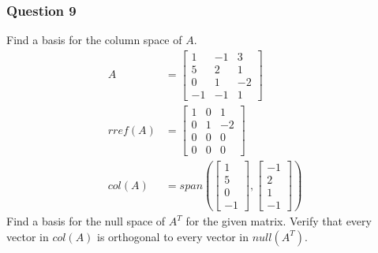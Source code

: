 \documentclass{math}
\begin{document}
\subsubsection*{Question 9}
Find a basis for the column space of \( A \).
\begin{align*}
  A &= \begin{bmatrix}
    1 & -1 & 3 \\
    5 & 2 & 1 \\
    0 & 1 & -2 \\
    -1 & -1 & 1
  \end{bmatrix} \\
  rref(A) &= \begin{bmatrix}
    1 & 0 & 1 \\
    0 & 1 & -2 \\
    0 & 0 & 0 \\
    0 & 0 & 0
  \end{bmatrix} \\
  col(A) &= span\left(
    \begin{bmatrix}1 \\ 5 \\ 0 \\ -1\end{bmatrix},
    \begin{bmatrix}-1 \\ 2 \\ 1 \\ -1\end{bmatrix}
  \right)
\end{align*}
Find a basis for the null space of \( A^T \) for the given matrix. Verify that
every vector in \( col(A) \) is orthogonal to every vector in \( null(A^T) \).
\end{document}
